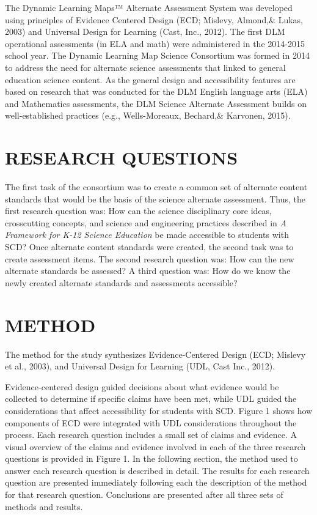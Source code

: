 \documentclass[11.5pt]{sig-alternate} %
\begin{document}
\begin{large}
The Dynamic Learning Maps™ Alternate Assessment System was developed using principles of Evidence Centered Design (ECD; Mislevy, Almond,\& Lukas, 2003) and Universal Design for Learning (Cast, Inc., 2012). The first DLM operational assessments (in ELA and math) were administered in the 2014-2015 school year. The Dynamic Learning Map Science Consortium was formed in 2014 to address the need for alternate science assessments that linked to general education science content. As the general design and accessibility features are based on research that was conducted for the DLM English language arts (ELA) and Mathematics assessments, the DLM Science Alternate Assessment builds on well-established practices (e.g., Wells-Moreaux, Bechard,\& Karvonen, 2015).

\section*{RESEARCH QUESTIONS}

The first task of the consortium was to create a common set of alternate content standards that would be the basis of the science alternate assessment. Thus, the first research question was: How can the science disciplinary core ideas, crosscutting concepts, and science and engineering practices described in \textit{A Framework for K-12 Science Education} be made accessible to students with SCD? Once alternate content standards were created, the second task was to create assessment items. The second research question was: How can the new alternate standards be assessed? A third question was: How do we know the newly created alternate standards and assessments accessible?

\section*{METHOD}

The method for the study synthesizes Evidence-Centered Design (ECD; Mislevy et al., 2003), and Universal Design for Learning (UDL, Cast Inc., 2012).     

Evidence-centered design guided decisions about what evidence would be collected to determine if specific claims have been met, while UDL guided the considerations that affect accessibility for students with SCD. Figure 1 shows how components of ECD were integrated with UDL considerations throughout the process. Each research question includes a small set of claims and evidence. A visual overview of the claims and evidence involved in each of the three research questions is provided in Figure 1. In the following section, the method used to answer each research question is described in detail. The results for each research question are presented immediately following each the description of the method for that research question. Conclusions are presented after all three sets of methods and results.


\end{large}
\end{document}
